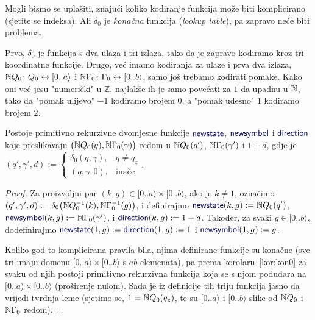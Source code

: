 Mogli bismo se uplašiti, znajući koliko kodiranje funkcija može biti komplicirano (sjetite se indeksa). Ali $\delta_0$ je \emph{konačna} funkcija (\emph{lookup table}), pa zapravo neće biti problema.

Prvo, $\delta_0$ je funkcija s dva ulaza i tri izlaza, tako da je zapravo kodiramo kroz tri koordinatne funkcije. Drugo, već imamo kodiranja za ulaze i prva dva izlaza, ${\mathbb N} Q_0\colon Q_0\leftrightarrow[0..a\rangle$ i ${\mathbb N}\Gamma_0\colon\Gamma_0\leftrightarrow[0..b\rangle$, samo još trebamo kodirati pomake. Kako oni već jesu "numerički" u $\mathbb Z$, najlakše ih je samo povećati za $1$ da upadnu u ${\mathbb N}$, tako da "pomak ulijevo" $-1$ kodiramo brojem $0$, a "pomak udesno" $1$ kodiramo brojem $2$.

\begin{lema}\label{lm:newssdprn}
Postoje primitivno rekurzivne dvomjesne funkcije $\f{newstate}$, $\f{newsymbol}$ i $\f{direction}$ koje preslikavaju $\bigl({\mathbb N} Q_0(q),{\mathbb N}\Gamma_0(\gamma)\bigr)$ redom u ${\mathbb N} Q_0(q')$, ${\mathbb N}\Gamma_0(\gamma')$ i $1+d$, gdje je 
$(q',\gamma',d):=\begin{cases}
\delta_0(q,\gamma),& q\not=q_z\\
(q,\gamma,0),&\text{inače}\end{cases}$.
\end{lema}
\begin{proof}
Za proizvoljni par $(k,g)\in[0..a\rangle\times[0..b\rangle$, ako je $k\not=1$, označimo $(q',\gamma',d):=\delta_0\bigl({\mathbb N} Q_0^{-1}(k),{\mathbb N}\Gamma_0^{-1}(g)\bigr)$, i definirajmo $\f{newstate}(k,g):=\N Q_0(q')$, $\f{newsymbol}(k,g):=\N\Gamma_0(\gamma')$, i $\f{direction}(k,g):=1+d$. Također, za svaki $g\in[0..b\rangle$, dodefinirajmo $\f{newstate}(1,g):=\f{direction}(1,g):=1$ i $\f{newsymbol}(1,g):=g$.

Koliko god to komplicirana pravila bila, njima definirane funkcije su konačne (sve tri imaju domenu $[0..a\rangle\times[0..b\rangle$ s $ab$ elemenata), pa prema korolaru~\ref{kor:kon0} za svaku od njih postoji primitivno rekurzivna funkcija koja se s njom podudara na $[0..a\rangle\times[0..b\rangle$ (proširenje nulom). Sada je iz definicije tih triju funkcija jasno da vrijedi tvrdnja leme (sjetimo se, $1={\mathbb N} Q_0(q_z)$, te su $[0..a\rangle$ i $[0..b\rangle$ slike od ${\mathbb N} Q_0$ i ${\mathbb N}\Gamma_0$ redom).
\end{proof}

